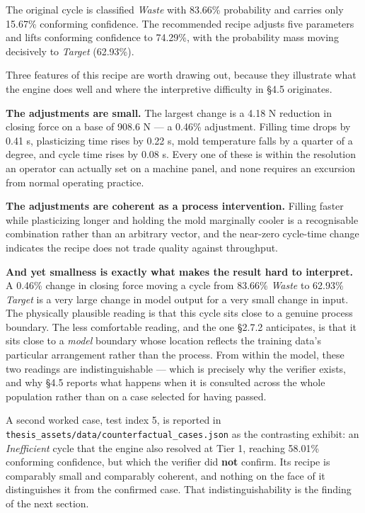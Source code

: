 The original cycle is classified \emph{Waste} with 83.66\% probability and carries only 15.67\% conforming confidence. The recommended recipe adjusts five parameters and lifts conforming confidence to 74.29\%, with the probability mass moving decisively to \emph{Target} (62.93\%).

Three features of this recipe are worth drawing out, because they illustrate what the engine does well and where the interpretive difficulty in §4.5 originates.

\textbf{The adjustments are small.} The largest change is a 4.18 N reduction in closing force on a base of 908.6 N --- a 0.46\% adjustment. Filling time drops by 0.41 s, plasticizing time rises by 0.22 s, mold temperature falls by a quarter of a degree, and cycle time rises by 0.08 s. Every one of these is within the resolution an operator can actually set on a machine panel, and none requires an excursion from normal operating practice.

\textbf{The adjustments are coherent as a process intervention.} Filling faster while plasticizing longer and holding the mold marginally cooler is a recognisable combination rather than an arbitrary vector, and the near-zero cycle-time change indicates the recipe does not trade quality against throughput.

\textbf{And yet smallness is exactly what makes the result hard to interpret.} A 0.46\% change in closing force moving a cycle from 83.66\% \emph{Waste} to 62.93\% \emph{Target} is a very large change in model output for a very small change in input. The physically plausible reading is that this cycle sits close to a genuine process boundary. The less comfortable reading, and the one §2.7.2 anticipates, is that it sits close to a \emph{model} boundary whose location reflects the training data's particular arrangement rather than the process. From within the model, these two readings are indistinguishable --- which is precisely why the verifier exists, and why §4.5 reports what happens when it is consulted across the whole population rather than on a case selected for having passed.

A second worked case, test index 5, is reported in \texttt{thesis\_assets/data/counterfactual\_cases.json} as the contrasting exhibit: an \emph{Inefficient} cycle that the engine also resolved at Tier 1, reaching 58.01\% conforming confidence, but which the verifier did \textbf{not} confirm. Its recipe is comparably small and comparably coherent, and nothing on the face of it distinguishes it from the confirmed case. That indistinguishability is the finding of the next section.

